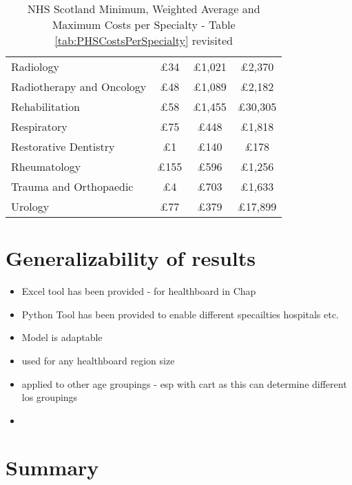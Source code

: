 \documentclass[../thesis.tex]{subfiles}
\begin{document}
\begin{table}[h!]
\begin{tabular}{lccc}
        Radiology & $\pounds$34 & $\pounds$1,021 & $\pounds$2,370\\
        Radiotherapy and Oncology & $\pounds$48 & $\pounds$1,089 & $\pounds$2,182 \\ 
        Rehabilitation & $\pounds$58 & $\pounds$1,455 & $\pounds$30,305 \\
        Respiratory & $\pounds$75 & $\pounds$448 & $\pounds$1,818 \\
        Restorative Dentistry & $\pounds$1 & $\pounds$140 & $\pounds$178 \\
        Rheumatology & $\pounds$155 & $\pounds$596 & $\pounds$1,256 \\
        Trauma and Orthopaedic & $\pounds$4 & $\pounds$703 & $\pounds$1,633 \\
        Urology & $\pounds$77 & $\pounds$379 & $\pounds$17,899 \\ \bottomrule
    \end{tabular}
    \caption{NHS Scotland Minimum, Weighted Average and Maximum Costs per Specialty \cite{PHS2021} - Table \ref{tab:PHSCostsPerSpecialty} revisited}
    \label{tab:PHSCostsPerSpecialty2}
\end{table}


\section{Generalizability of results}
\begin{itemize}
\item Excel tool has been provided - for healthboard in Chap
\item Python Tool has been provided to enable different specailties  hospitals etc.
    \item Model is adaptable
    \item used for any healthboard region size
    \item applied to other age groupings - esp with cart as this can determine different los groupings
    \item 
\end{itemize}

\section{Summary}
\end{document}
